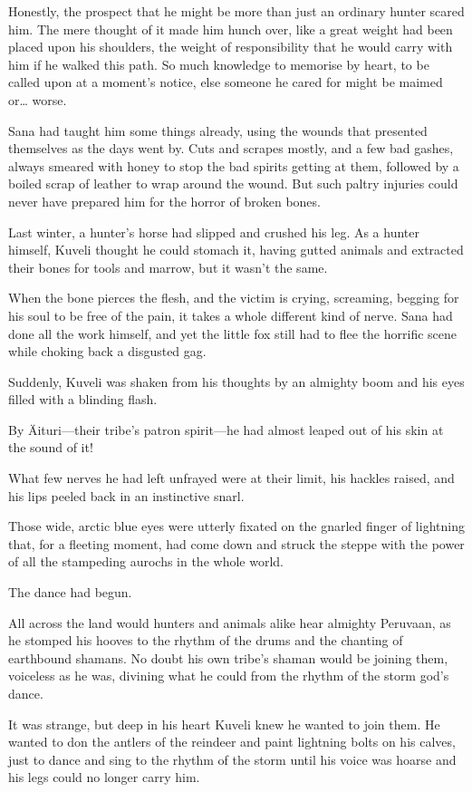 Honestly, the prospect that he might be more than just an ordinary hunter scared him. The mere thought of it made him hunch over, like a great weight had been placed upon his shoulders, the weight of responsibility that he would carry with him if he walked this path. So much knowledge to memorise by heart, to be called upon at a moment's notice, else someone he cared for might be maimed or\ldots{} worse.

Sana had taught him some things already, using the wounds that presented themselves as the days went by. Cuts and scrapes mostly, and a few bad gashes, always smeared with honey to stop the bad spirits getting at them, followed by a boiled scrap of leather to wrap around the wound. But such paltry injuries could never have prepared him for the horror of broken bones.

Last winter, a hunter's horse had slipped and crushed his leg. As a hunter himself, Kuveli thought he could stomach it, having gutted animals and extracted their bones for tools and marrow, but it wasn't the same.

When the bone pierces the flesh, and the victim is crying, screaming, begging for his soul to be free of the pain, it takes a whole different kind of nerve. Sana had done all the work himself, and yet the little fox still had to flee the horrific scene while choking back a disgusted gag.

Suddenly, Kuveli was shaken from his thoughts by an almighty boom and his eyes filled with a blinding flash.

By Äituri---their tribe's patron spirit---he had almost leaped out of his skin at the sound of it!

What few nerves he had left unfrayed were at their limit, his hackles raised, and his lips peeled back in an instinctive snarl.

Those wide, arctic blue eyes were utterly fixated on the gnarled finger of lightning that, for a fleeting moment, had come down and struck the steppe with the power of all the stampeding aurochs in the whole world.

The dance had begun.

All across the land would hunters and animals alike hear almighty Peruvaan, as he stomped his hooves to the rhythm of the drums and the chanting of earthbound shamans. No doubt his own tribe's shaman would be joining them, voiceless as he was, divining what he could from the rhythm of the storm god's dance.

It was strange, but deep in his heart Kuveli knew he wanted to join them. He wanted to don the antlers of the reindeer and paint lightning bolts on his calves, just to dance and sing to the rhythm of the storm until his voice was hoarse and his legs could no longer carry him.


